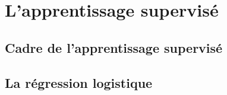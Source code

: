 \documentclass[10pt]{beamer}
\begin{document}
\section*{L'apprentissage supervisé}


\subsection*{Cadre de l'apprentissage supervisé}

\subsection*{La régression logistique}



%



\end{document}
